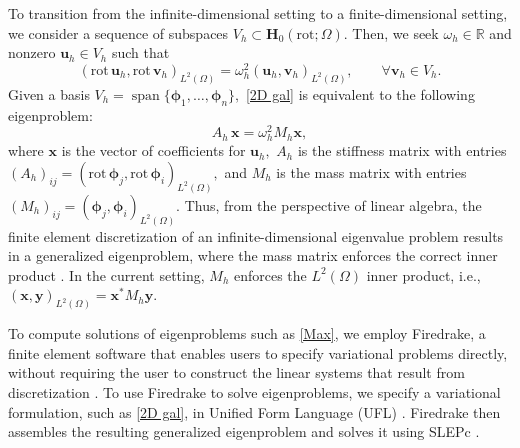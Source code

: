To transition from the infinite-dimensional setting to a finite-dimensional setting, we consider a sequence of subspaces $V_h \subset \mathbf{H}_0(\text{rot}; \Omega).$ Then, we seek $\omega_h \in \mathbb{R}$ and nonzero $\mathbf{u}_h \in V_h$ such that 
\begin{equation} \label{2D gal}
    ( \text{rot}\, \mathbf{u}_h, \text{rot} \, \mathbf{v}_h)_{L^2(\Omega)} = \omega_h^2(\mathbf{u}_h, \mathbf{v}_h)_{L^2(\Omega)}, \qquad \forall \mathbf{v}_h \in V_h.
\end{equation}
Given a basis $V_h = \operatorname{span}\{\boldsymbol{\phi}_1,\ldots,\boldsymbol{\phi}_n\},$ \eqref{2D gal} is equivalent to the following eigenproblem:
\begin{equation} \label{Ax=b}
    A_h \, \mathbf{x} = \omega_h^2 M_h \mathbf{x},
\end{equation}
where $\mathbf{x}$ is the vector of coefficients for $\mathbf{u}_h,$ $A_h$ is the stiffness matrix with entries $(A_h)_{ij} = (\text{rot} \, \boldsymbol{\phi}_j, \text{rot} \, \boldsymbol{\phi}_i)_{L^2(\Omega)},$ and $M_h$ is the mass matrix with entries $(M_h)_{ij} = (\boldsymbol{\phi}_j, \boldsymbol{\phi}_i)_{L^2(\Omega)}.$ Thus, from the perspective of linear algebra, the finite element discretization of an infinite-dimensional eigenvalue problem results in a generalized eigenproblem, where the mass matrix enforces the correct inner product \cite{PatrickNote}. In the current setting, $M_h$ enforces the $L^2(\Omega)$ inner product, i.e., $(\mathbf{x}, \mathbf{y})_{L^2(\Omega)} = \mathbf{x}^* M_h \mathbf{y}$.


To compute solutions of eigenproblems such as \eqref{Max}, we employ Firedrake, a finite element software that enables users to specify variational problems directly, without requiring the user to construct the linear systems that result from discretization \cite{Firedrake}. To use Firedrake to solve eigenproblems, we specify a variational formulation, such as \eqref{2D gal}, in Unified Form Language (UFL) \cite{ufl}. Firedrake then assembles the resulting generalized eigenproblem and solves it using SLEPc \cite{slep}. 


